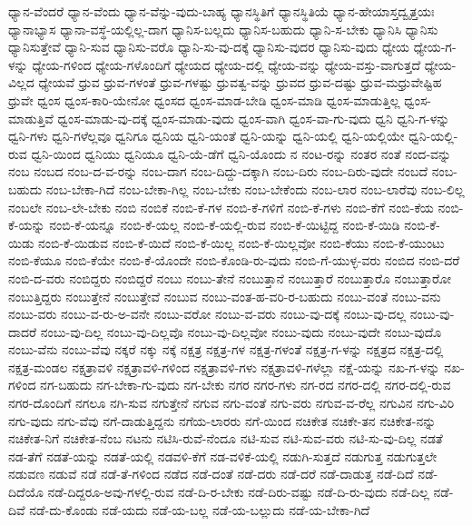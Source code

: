 {ಧ್ಯಾನ-ವೆಂದರೆ
ಧ್ಯಾನ-ವೆಂದು
ಧ್ಯಾನ-ವೆನ್ನು-ವುದು-ಬಾಹ್ಯ
ಧ್ಯಾನಸ್ಥಿತಿಗೆ
ಧ್ಯಾನಸ್ಥಿತಿಯೆ
ಧ್ಯಾನ-ಹೇಯಾಸ್ತದ್ವೃತ್ತಯಃ
ಧ್ಯಾನಾಭ್ಯಾಸ
ಧ್ಯಾನಾ-ವಸ್ಥೆ-ಯಲ್ಲಿಲ್ಲ-ದಾಗ
ಧ್ಯಾನಿಸ-ಬಲ್ಲದು
ಧ್ಯಾನಿಸ-ಬಹುದು
ಧ್ಯಾನಿ-ಸ-ಬೇಕು
ಧ್ಯಾನಿಸಿ
ಧ್ಯಾನಿಸು
ಧ್ಯಾನಿಸುತ್ತೇವೆ
ಧ್ಯಾನಿ-ಸುವ
ಧ್ಯಾನಿಸು-ವರೊ
ಧ್ಯಾನಿ-ಸು-ವು-ದಕ್ಕೆ
ಧ್ಯಾನಿಸು-ವುದರ
ಧ್ಯಾನಿಸು-ವುದು
ಧ್ಯೇಯ
ಧ್ಯೇಯ-ಗ-ಳನ್ನು
ಧ್ಯೇಯ-ಗಳಿಂದ
ಧ್ಯೇಯ-ಗಳೊಂದಿಗೆ
ಧ್ಯೇಯದ
ಧ್ಯೇಯ-ದಲ್ಲಿ
ಧ್ಯೇಯ-ವನ್ನು
ಧ್ಯೇಯ-ವಸ್ತು-ವಾಗುತ್ತದೆ
ಧ್ಯೇಯ-ವಿಲ್ಲದ
ಧ್ಯೇಯವೆ
ಧ್ರುವ
ಧ್ರುವ-ಗಳಂತೆ
ಧ್ರುವ-ಗಳಷ್ಟು
ಧ್ರುವತ್ವ-ವನ್ನು
ಧ್ರುವದ
ಧ್ರುವ-ದಷ್ಟು
ಧ್ರುವ-ಮಧ್ರುವೇಷ್ಟಿಹ
ಧ್ರುವೇ
ಧ್ವಂಸ
ಧ್ವಂಸ-ಕಾರಿ-ಯೇನೋ
ಧ್ವಂಸದ
ಧ್ವಂಸ-ಮಾಡ-ಬೇಡಿ
ಧ್ವಂಸ-ಮಾಡಿ
ಧ್ವಂಸ-ಮಾಡುತ್ತಿಲ್ಲ
ಧ್ವಂಸ-ಮಾಡುತ್ತಿವೆ
ಧ್ವಂಸ-ಮಾಡು-ವು-ದಕ್ಕೆ
ಧ್ವಂಸ-ಮಾಡು-ವುದು
ಧ್ವಂಸ-ವಾಗಿ
ಧ್ವಂಸ-ವಾ-ಗು-ವುದು
ಧ್ವನಿ
ಧ್ವನಿ-ಗ-ಳನ್ನು
ಧ್ವನಿ-ಗಳು
ಧ್ವನಿ-ಗಳೆಲ್ಲವೂ
ಧ್ವನಿಗೂ
ಧ್ವನಿಯ
ಧ್ವನಿ-ಯಂತೆ
ಧ್ವನಿ-ಯನ್ನು
ಧ್ವನಿ-ಯಲ್ಲಿ
ಧ್ವನಿ-ಯಲ್ಲಿಯೇ
ಧ್ವನಿ-ಯಲ್ಲಿ-ರುವ
ಧ್ವನಿ-ಯಿಂದ
ಧ್ವನಿಯು
ಧ್ವನಿಯೂ
ಧ್ವನಿ-ಯೆ-ಡೆಗೆ
ಧ್ವನಿ-ಯೊಂದು
ನ
ನಂಟ-ರನ್ನು
ನಂತರ
ನಂತೆ
ನಂದ-ವನ್ನು
ನಂಬ
ನಂಬದ
ನಂಬ-ದ-ವ-ರನ್ನು
ನಂಬ-ದಾಗ
ನಂಬ-ದಿದ್ದು-ದಕ್ಕಾಗಿ
ನಂಬ-ದಿರು
ನಂಬ-ದಿರು-ವುದೇ
ನಂಬದೆ
ನಂಬ-ಬಹುದು
ನಂಬ-ಬೇಕಾ-ಗಿದೆ
ನಂಬ-ಬೇಕಾ-ಗಿಲ್ಲ
ನಂಬ-ಬೇಕು
ನಂಬ-ಬೇಕೆಂದು
ನಂಬ-ಲಾರ
ನಂಬ-ಲಾರೆವು
ನಂಬ-ಲಿಲ್ಲ
ನಂಬಲೇ
ನಂಬ-ಲೇ-ಬೇಕು
ನಂಬಿ
ನಂಬಿಕೆ
ನಂಬಿ-ಕೆ-ಗಳ
ನಂಬಿ-ಕೆ-ಗಳಿಗೆ
ನಂಬಿ-ಕೆ-ಗಳು
ನಂಬಿ-ಕೆಗೆ
ನಂಬಿ-ಕೆಯ
ನಂಬಿ-ಕೆ-ಯನ್ನು
ನಂಬಿ-ಕೆ-ಯನ್ನೂ
ನಂಬಿ-ಕೆ-ಯಲ್ಲ
ನಂಬಿ-ಕೆ-ಯಲ್ಲಿ-ರುವ
ನಂಬಿ-ಕೆ-ಯಿಟ್ಟಿದ್ದ
ನಂಬಿ-ಕೆ-ಯಿಡಿ
ನಂಬಿ-ಕೆ-ಯಿಡು
ನಂಬಿ-ಕೆ-ಯಿಡುವ
ನಂಬಿ-ಕೆ-ಯಿದೆ
ನಂಬಿ-ಕೆ-ಯಿಲ್ಲ
ನಂಬಿ-ಕೆ-ಯಿಲ್ಲವೋ
ನಂಬಿ-ಕೆಯು
ನಂಬಿ-ಕೆ-ಯುಂಟು
ನಂಬಿ-ಕೆಯೂ
ನಂಬಿ-ಕೆಯೇ
ನಂಬಿ-ಕೆ-ಯೊಂದೇ
ನಂಬಿ-ಕೊಂಡಿ-ರು-ವುದು
ನಂಬಿ-ಗೆ-ಯುಳ್ಳ-ವರು
ನಂಬಿದ
ನಂಬಿ-ದರೆ
ನಂಬಿ-ದ-ವರು
ನಂಬಿದ್ದರು
ನಂಬಿದ್ದರೆ
ನಂಬು
ನಂಬು-ತೇನೆ
ನಂಬುತ್ತಾನೆ
ನಂಬುತ್ತಾರೆ
ನಂಬುತ್ತಾರೊ
ನಂಬುತ್ತಾರೋ
ನಂಬುತ್ತಿದ್ದರು
ನಂಬುತ್ತೇನೆ
ನಂಬುತ್ತೇವೆ
ನಂಬುವ
ನಂಬು-ವಂತ-ಹ-ವರಿ-ರ-ಬಹುದು
ನಂಬು-ವಂತೆ
ನಂಬು-ವನು
ನಂಬು-ವರು
ನಂಬು-ವ-ರು-ಅ-ವನೇ
ನಂಬು-ವರೋ
ನಂಬು-ವ-ವರು
ನಂಬು-ವು-ದಕ್ಕೆ
ನಂಬು-ವು-ದಲ್ಲ
ನಂಬು-ವು-ದಾದರೆ
ನಂಬು-ವು-ದಿಲ್ಲ
ನಂಬು-ವು-ದಿಲ್ಲವೊ
ನಂಬು-ವು-ದಿಲ್ಲವೋ
ನಂಬು-ವುದು
ನಂಬು-ವುದೇ
ನಂಬು-ವುದೊ
ನಂಬು-ವೆನು
ನಂಬು-ವೆವು
ನಕ್ಕರೆ
ನಕ್ಕು
ನಕ್ಕೆ
ನಕ್ಷತ್ರ
ನಕ್ಷತ್ರ-ಗಳ
ನಕ್ಷತ್ರ-ಗಳಂತೆ
ನಕ್ಷತ್ರ-ಗ-ಳನ್ನು
ನಕ್ಷತ್ರದ
ನಕ್ಷತ್ರ-ದಲ್ಲಿ
ನಕ್ಷತ್ರ-ಮಂಡಲ
ನಕ್ಷತ್ರಾವಳಿ
ನಕ್ಷತ್ರಾವಳಿ-ಗಳಿಂದ
ನಕ್ಷತ್ರಾವಳಿ-ಗಳು
ನಕ್ಷತ್ರಾವಳಿ-ಗಳೆಲ್ಲಾ
ನಕ್ಷೆ-ಯನ್ನು
ನಖ-ಗ-ಳನ್ನು
ನಖ-ಗಳಿಂದ
ನಗ-ಬಹುದು
ನಗ-ಬೇಕಾ-ಗು-ವುದು
ನಗ-ಬೇಕು
ನಗರ
ನಗರ-ಗಳು
ನಗ-ರದ
ನಗರ-ದಲ್ಲಿ
ನಗರ-ದಲ್ಲಿ-ರುವ
ನಗರ-ದೊಂದಿಗೆ
ನಗಲೂ
ನಗಿ-ಸುವ
ನಗುತ್ತೇನೆ
ನಗುವ
ನಗು-ವಂತೆ
ನಗು-ವರು
ನಗುವ-ವ-ರೆಲ್ಲ
ನಗುವಿನ
ನಗು-ವಿರಿ
ನಗು-ವುದು
ನಗು-ವೆವು
ನಗೆ-ದಾಡುತ್ತಿದ್ದನು
ನಗೆಯ-ಲಾರರು
ನಗೆ-ಯಿಂದ
ನಚಿಕೇತ
ನಚಿಕೇ-ತನ
ನಚಿಕೇತ-ನನ್ನು
ನಚಿಕೇತ-ನಿಗೆ
ನಚಿಕೇತ-ನೆಂಬ
ನಟನು
ನಟಿಸಿ-ರುವೆ-ನೆಂದೂ
ನಟಿ-ಸುವ
ನಟಿ-ಸುವ-ವರು
ನಟಿ-ಸು-ವು-ದಿಲ್ಲ
ನಡತೆ
ನಡ-ತೆಗೆ
ನಡತೆ-ಯನ್ನು
ನಡತೆ-ಯಲ್ಲಿ
ನಡವಳಿ-ಕೆಗೆ
ನಡ-ವಳಿಕೆ-ಯಲ್ಲಿ
ನಡುಗಿ-ಸುತ್ತದೆ
ನಡುಗುತ್ತ
ನಡುಗುತ್ತಲೇ
ನಡುವಣ
ನಡುವೆ
ನಡೆ
ನಡೆ-ತೆ-ಗಳಿಂದ
ನಡೆದ
ನಡೆ-ದಂತೆ
ನಡೆ-ದರು
ನಡೆ-ದರೆ
ನಡೆ-ದಾಡುತ್ತ
ನಡೆ-ದಿದೆ
ನಡೆ-ದಿದೆಯೊ
ನಡೆ-ದಿದ್ದರೂ-ಅವು-ಗಳಲ್ಲಿ-ರುವ
ನಡೆ-ದಿ-ರ-ಬೇಕು
ನಡೆ-ದಿರು-ವಷ್ಟು
ನಡೆ-ದಿ-ರು-ವುದು
ನಡೆ-ದಿಲ್ಲ
ನಡೆ-ದಿವೆ
ನಡೆ-ದು-ಕೊಂಡು
ನಡೆ-ಯದು
ನಡೆ-ಯ-ಬಲ್ಲ
ನಡೆ-ಯ-ಬಲ್ಲುದು
ನಡೆ-ಯ-ಬೇಕಾ-ಗಿದೆ
}
